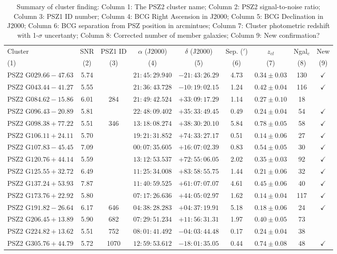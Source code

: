 \documentclass[apj, revtex4-1]{emulateapj}
\begin{document}
\begin{table}
	\caption[Summary of Cluster Finding]{Summary of cluster finding: Column 1: The PSZ2 cluster name; Column 2: PSZ2 signal-to-noise ratio; Column 3: PSZ1 ID number; Column 4: BCG Right Ascension in J2000; Column 5: BCG Declination in J2000; Column 6: BCG separation from PSZ position in arcmintues; Column 7: Cluster photometric redshift with 1-$\sigma$ uncertanty; Column 8: Corrected number of member galaxies; Column 9: New confirmation? }
	\centering
	\begin{tabular}{lcccccccc}
	\hline
	Cluster & SNR & PSZ1 ID & $\alpha$ (J2000) & $\delta$ (J2000) & Sep. ($'$) & $z_{cl}$ & Ngal$_c$ & New\\
	(1) & (2) & (3) & (4) & (5) & (6) & (7) & (8) & (9) \\
	\hline
	 PSZ2 G$029.66-47.63$ & 5.74 & \nd & $21:45:29.940$ & $-21:43:26.29$ & 4.73 & $0.34 \pm 0.03$ & 130 & $\checkmark$ \\
	 PSZ2 G$043.44-41.27$ & 5.55 & \nd & $21:36:43.728$ & $-10:19:02.15$ & 1.24 & $0.42 \pm 0.04$ & 116 & $\checkmark$ \\
	 PSZ2 G$084.62-15.86$ & 6.01 & 284 & $21:49:42.524$ & $+33:09:17.29$ & 1.14 & $0.27 \pm 0.10$ & 18 & \\
	 PSZ2 G$096.43-20.89$ & 5.81 & \nd & $22:48:09.402$ & $+35:33:49.45$ & 0.49 & $0.24 \pm 0.04$ & 54 & $\checkmark$ \\
	 PSZ2 G$098.38+77.22$ & 5.51 & 346 & $13:18:08.274$ & $+38:30:20.10$ & 5.84 & $0.78 \pm 0.05$ & 58 & $\checkmark$ \\
	 PSZ2 G$106.11+24.11$ & 5.70 & \nd & $19:21:31.852$ & $+74:33:27.17$ & 0.51 & $0.14 \pm 0.06$ & 27 & $\checkmark$ \\
	 PSZ2 G$107.83-45.45$ & 7.09 & \nd & $00:07:35.605$ & $+16:07:02.39$ & 0.83 & $0.54 \pm 0.05$ & 30 & $\checkmark$ \\
	 PSZ2 G$120.76+44.14$ & 5.59 & \nd & $13:12:53.537$ & $+72:55:06.05$ & 2.02 & $0.35 \pm 0.03$ & 92 & $\checkmark$ \\
	 PSZ2 G$125.55+32.72$ & 6.49 & \nd & $11:25:34.008$ & $+83:58:55.75$ & 1.44 & $0.21 \pm 0.06$ & 32 & $\checkmark$ \\
	 PSZ2 G$137.24+53.93$ & 7.87 & \nd & $11:40:59.525$ & $+61:07:07.07$ & 4.61 & $0.45 \pm 0.06$ & 40 & $\checkmark$ \\
	 PSZ2 G$173.76+22.92$ & 5.80 & \nd & $07:17:26.636$ & $+44:05:02.97$ & 1.62 & $0.14 \pm 0.04$ & 117 & $\checkmark$ \\
	 PSZ2 G$191.82-26.64$ & 6.17 & 646 & $04:38:28.283$ & $+04:37:19.91$ & 5.18 & $0.18 \pm 0.06$ & 24 & $\checkmark$ \\
	 PSZ2 G$206.45+13.89$ & 5.90 & 682 & $07:29:51.234$ & $+11:56:31.31$ & 1.97 & $0.40 \pm 0.05$ & 73 & \\
	 PSZ2 G$224.82+13.62$ & 5.51 & 752 & $08:01:41.492$ & $-04:03:44.48$ & 0.17 & $0.24 \pm 0.04$ & 38 & \\
	 PSZ2 G$305.76+44.79$ & 5.72 & 1070 & $12:59:53.612$ & $-18:01:35.05$ & 0.44 & $0.74 \pm 0.08$ & 48 & $\checkmark$ \\
	\hline
	\end{tabular}
\label{tbl:results}
\end{table}
\end{document}
